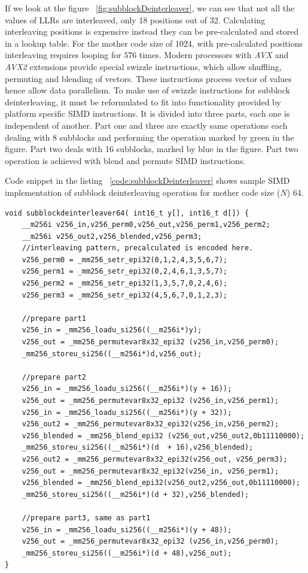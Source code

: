 If we look at the figure ~\ref{fig:subblockDeinterleaver}, we can see that not all the values of LLRs are interleaved, only 18 positions out of 32. Calculating interleaving positions is expensive instead they can be pre-calculated and stored in a lookup table. For the mother code size of 1024, with pre-calculated positions interleaving requires looping for $ 576 $ times. Modern processors with \textit{AVX} and \textit{AVX2} extensions provide special swizzle instructions, which allow shuffling, permuting and blending of vectors. These instructions process vector of values hence allow data parallelism. To make use of swizzle instructions for subblock deinterleaving, it must be reformulated to fit into functionality provided by platform specific SIMD instructions. It is divided into three parts, each one is independent of another. Part one and three are exactly same operations each dealing with 8 subblocks and performing the operation marked by green in the figure. Part two deals with 16 subblocks, marked by blue in the figure. Part two operation is achieved with blend and permute SIMD instructions.

Code snippet in the listing ~\ref{code:subblockDeinterleaver} shows sample SIMD implementation of subblock deinterleaving operation for mother code size ($N$) 64.

\begin{code}
\label{code:subblockDeinterleaver}
\begin{verbatim}
void subblockdeinterleaver64( int16_t y[], int16_t d[]) {
	__m256i v256_in,v256_perm0,v256_out,v256_perm1,v256_perm2;
	__m256i v256_out2,v256_blended,v256_perm3;
	//interleaving pattern, precalculated is encoded here.
	v256_perm0 = _mm256_setr_epi32(0,1,2,4,3,5,6,7);
	v256_perm1 = _mm256_setr_epi32(0,2,4,6,1,3,5,7);
	v256_perm2 = _mm256_setr_epi32(1,3,5,7,0,2,4,6);
	v256_perm3 = _mm256_setr_epi32(4,5,6,7,0,1,2,3);
	
	//prepare part1
	v256_in = _mm256_loadu_si256((__m256i*)y);
	v256_out = _mm256_permutevar8x32_epi32 (v256_in,v256_perm0);
	_mm256_storeu_si256((__m256i*)d,v256_out);
	
	//prepare part2
	v256_in = _mm256_loadu_si256((__m256i*)(y + 16));
	v256_out = _mm256_permutevar8x32_epi32 (v256_in,v256_perm1);
	v256_in = _mm256_loadu_si256((__m256i*)(y + 32));
	v256_out2 = _mm256_permutevar8x32_epi32(v256_in,v256_perm2);
	v256_blended = _mm256_blend_epi32 (v256_out,v256_out2,0b11110000);
	_mm256_storeu_si256((__m256i*)(d  + 16),v256_blended);
	v256_out2 = _mm256_permutevar8x32_epi32(v256_out, v256_perm3);
	v256_out = _mm256_permutevar8x32_epi32(v256_in, v256_perm1);
	v256_blended = _mm256_blend_epi32(v256_out2,v256_out,0b11110000);
	_mm256_storeu_si256((__m256i*)(d + 32),v256_blended);
	
	//prepare part3, same as part1
	v256_in = _mm256_loadu_si256((__m256i*)(y + 48));
	v256_out = _mm256_permutevar8x32_epi32 (v256_in,v256_perm0);
	_mm256_storeu_si256((__m256i*)(d + 48),v256_out);	
}
\end{verbatim}
\end{code}

